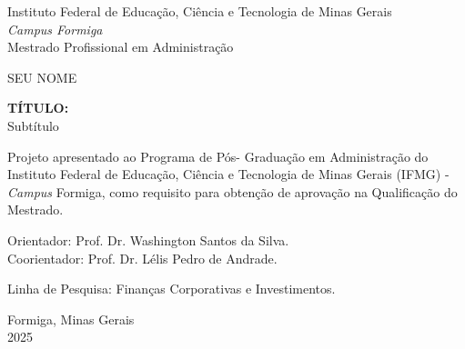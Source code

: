 
\thispagestyle{empty}

\begin{center}
    \large
    Instituto Federal de Educação, Ciência e Tecnologia de Minas Gerais \\ 
    \textit{Campus Formiga} \\
    \sc Mestrado Profissional em Administração
    
    \vspace{3cm}
    SEU NOME
    
    \vspace{3cm}
    \textbf{TÍTULO:} \\
    Subtítulo
    
    \vspace{2cm}
    \begin{flushright}
    \begin{minipage}{0.6\textwidth}
    \small
    Projeto apresentado ao Programa de Pós-
    Graduação em Administração do Instituto
    Federal de Educação, Ciência e
    Tecnologia de Minas Gerais (IFMG) -
    \textit{Campus} Formiga, como requisito para
    obtenção de aprovação na Qualificação
    do Mestrado.
    \end{minipage}
    \end{flushright}
    
    \vspace{0.5cm}
    \begin{flushright}
    \small
    Orientador: Prof. Dr. Washington Santos da Silva.\\
    Coorientador: Prof. Dr. Lélis Pedro de Andrade.
    
    \vspace{0.5cm}
    Linha de Pesquisa: Finanças Corporativas e Investimentos.
    \end{flushright}
    
    \vfill
    Formiga, Minas Gerais \\
    2025
\end{center}


\newpage

\thispagestyle{empty}

\newenvironment{meuresumo}{
  \clearpage
  \small
  \vspace{-1cm}
  \begin{center}
    \bfseries RESUMO
    \vspace{0.5em}
  \end{center}
  \begin{quote}
}{
  \end{quote}
  \vspace{-1.1em}
  \begin{center}
  \begin{minipage}{0.87\textwidth} 
  \textbf{Palavras-chave:} palavra 1, palavra 2, palavra 3.
  \end{minipage}
  \end{center}
  \clearpage
}

